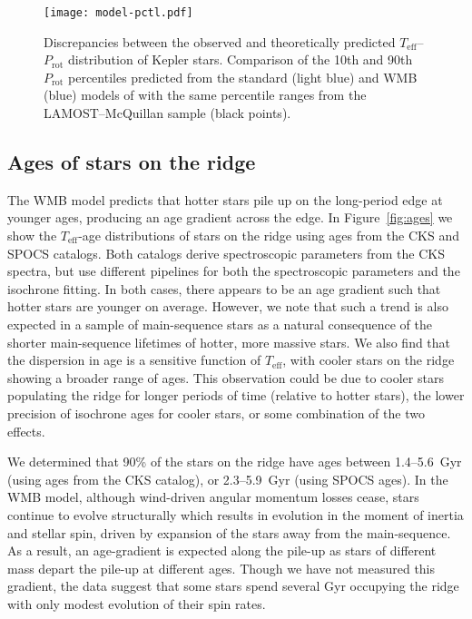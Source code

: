 \documentclass[linenumbers,tighten,trackchanges,twocolumn]{aastex631}
\newcommand{\teff}{\ensuremath{T_{\mathrm{eff}}}\xspace}
\newcommand{\prot}{\ensuremath{P_\mathrm{rot}}\xspace}
\begin{document}
\begin{figure}
    \centering
    \texttt{[image: model-pctl.pdf]}
    \caption{Discrepancies between the observed and theoretically predicted \teff--\prot distribution of Kepler stars. Comparison of the 10th and 90th \prot percentiles predicted from the standard (light blue) and WMB (blue) models of \citet{vanSaders2019} with the same percentile ranges from the LAMOST--McQuillan sample (black points).}
    \label{fig:model-pctl}
\end{figure}





\subsection{Ages of stars on the ridge}
\label{subsec:ages}
The WMB model predicts that hotter stars pile up on the long-period edge at younger ages, producing an age gradient across the edge. In Figure~\ref{fig:ages} we show the \teff-age distributions of stars on the ridge using ages from the CKS and SPOCS \citep{Brewer2018} catalogs. Both catalogs derive spectroscopic parameters from the CKS spectra, but use different pipelines for both the spectroscopic parameters and the isochrone fitting. In both cases, there appears to be an age gradient such that hotter stars are younger on average. However, we note that such a trend is also expected in a sample of main-sequence stars as a natural consequence of the shorter main-sequence lifetimes of hotter, more massive stars. We also find that the dispersion in age is a sensitive function of \teff, with cooler stars on the ridge showing a broader range of ages. This observation could be due to cooler stars populating the ridge for longer periods of time (relative to hotter stars), the lower precision of isochrone ages for cooler stars, or some combination of the two effects.

We determined that 90\% of the stars on the ridge have ages between 1.4--5.6~Gyr (using ages from the CKS catalog), or 2.3--5.9~Gyr (using SPOCS ages). In the WMB model, although wind-driven angular momentum losses cease, stars continue to evolve structurally which results in evolution in the moment of inertia and stellar spin, driven by expansion of the stars away from the main-sequence. As a result, an age-gradient is expected along the pile-up as stars of different mass depart the pile-up at different ages. Though we have not measured this gradient, the data suggest that some stars spend several Gyr occupying the ridge with only modest evolution of their spin rates.
\end{document}
